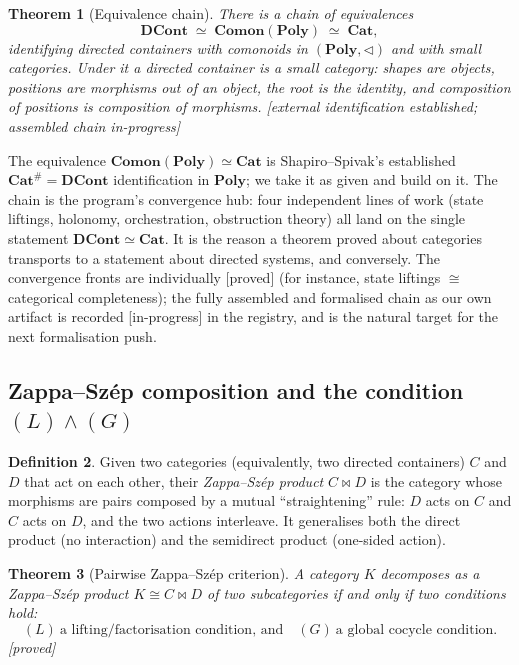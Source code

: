 \documentclass[11pt]{article}
\theoremstyle{plain}
\newtheorem{theorem}{Theorem}[section]
\theoremstyle{definition}
\newtheorem{definition}[theorem]{Definition}
\theoremstyle{remark}
\newcommand{\DCont}{\mathbf{DCont}}
\newcommand{\Cat}{\mathbf{Cat}}
\newcommand{\Poly}{\mathbf{Poly}}
\newcommand{\PolyComon}{\mathbf{Comon}(\Poly)}
\newcommand{\bowtiemap}{\bowtie}
\newcommand{\grade}[1]{{\small\textsf{[#1]}}}
\newcommand{\gProved}{\grade{proved}}
\newcommand{\gWIP}{\grade{in-progress}}
\begin{document}
\begin{theorem}[Equivalence chain]\label{thm:chain}
There is a chain of equivalences
\[
  \DCont \;\simeq\; \PolyComon \;\simeq\; \Cat,
\]
identifying directed containers with comonoids in $(\Poly,\triangleleft)$ and with small
categories. Under it a directed container \emph{is} a small category: shapes are objects,
positions are morphisms out of an object, the root is the identity, and composition of
positions is composition of morphisms.
\grade{external identification established; assembled chain in-progress}
\end{theorem}

The equivalence $\PolyComon \simeq \Cat$ is Shapiro--Spivak's established $\Cat^\# =
\DCont$ identification in $\Poly$; we take it as given and build on it. The chain is the
program's convergence hub: four independent lines of work (state liftings, holonomy,
orchestration, obstruction theory) all land on the single statement $\DCont \simeq \Cat$.
It is the reason a theorem proved about categories transports to a statement about
directed systems, and conversely. The convergence fronts are individually \gProved{} (for
instance, state liftings $\cong$ categorical completeness); the fully assembled and
formalised chain as our own artifact is recorded \gWIP{} in the registry, and is the
natural target for the next formalisation push.

\subsection{Zappa--Sz\'ep composition and the condition $(L)\wedge(G)$}\label{sec:zs}

\begin{definition}
Given two categories (equivalently, two directed containers) $C$ and $D$ that act on each
other, their \emph{Zappa--Sz\'ep product} $C \bowtiemap D$ is the category whose morphisms
are pairs composed by a mutual ``straightening'' rule: $D$ acts on $C$ and $C$ acts on
$D$, and the two actions interleave. It generalises both the direct product (no
interaction) and the semidirect product (one-sided action).
\end{definition}

\begin{theorem}[Pairwise Zappa--Sz\'ep criterion]\label{thm:zs}
A category $K$ decomposes as a Zappa--Sz\'ep product $K \cong C \bowtiemap D$ of two
subcategories if and only if two conditions hold:
\[
  (L)\ \text{a lifting/factorisation condition, and}\quad
  (G)\ \text{a global cocycle condition.}
\]
\gProved{}
\end{theorem}
\end{document}
